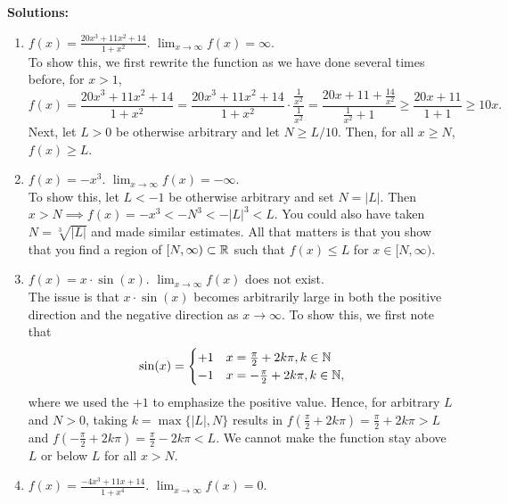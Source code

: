 \textbf{Solutions:}

\begin{enumerate}
\renewcommand{\labelenumi}{(\alph{enumi})}
\setlength{\itemsep}{.3cm}
    
\item $f(x) = \frac{20 x^3 + 11 x^2 + 14}{1 + x^2}$. \Ans $\displaystyle\lim_{x \to \infty} f(x) =  \infty$.\\

To show this, we first rewrite the function as we have done several times before, for $x>1$,
$$f(x) = \frac{20 x^3 + 11 x^2 + 14}{1 + x^2} =  \frac{20 x^3 + 11 x^2 + 14}{1 + x^2} \cdot  \frac{\frac{1}{x^2}}{\frac{1}{x^2}} = \frac{20 x + 11 + \frac{14}{x^2}}{\frac{1}{x^2} + 1}\ge \frac{20 x + 11}{1 + 1}\ge 10 x.$$
Next, let $L>0$ be otherwise arbitrary and let $ N \ge L/10$. Then, for all $x \ge N$, $f(x) \ge L. $

 \item  $f(x) = -x^3$. \Ans $\displaystyle\lim_{x \to \infty} f(x) = - \infty$.\\

 To show this, let $ L < -1$ be otherwise arbitrary and set $N=|L|$. Then $x > N \implies f(x) = -x^3 < - N^3 <-|L|^3 < L$. You could also have taken $N=\sqrt[3]{|L|}$ and made similar estimates. All that matters is that you show that you find a region of $[N, \infty) \subset \mathbb R$ such that $f(x) \le L$ for $x\in [N, \infty)$.

\item $f(x) = x \cdot \sin(x)$. \Ans $\displaystyle\lim_{x \to \infty} f(x)$ does not exist.\\

The issue is that $x\cdot \sin(x)$ becomes arbitrarily large in both the positive direction and the negative direction as $x \to \infty$. To show this, we first note that
$$ \sin(x) = \begin{cases} +1 & x = \frac{\pi}{2} + 2k \pi, k \in \mathbb N \\   -1 & x = -\frac{\pi}{2} + 2k \pi, k \in \mathbb N,\end{cases}$$
where we used the $+1$ to emphasize the positive value. Hence, for arbitrary $L$ and $N>0$, taking $k=\max\{|L|, N\}$ results in $f(\frac{\pi}{2} + 2k \pi) = \frac{\pi}{2} + 2k \pi > L$ and  $f(-\frac{\pi}{2} + 2k \pi) = \frac{\pi}{2} - 2k \pi < L$. We cannot make the function stay above $L$ or below $L$ for all $x > N$.

\item $f(x) = \frac{-4x^3 + 11 x + 14}{1 + x^4}$. \Ans $\displaystyle\lim_{x \to \infty} f(x) =  0$.\\


\end{enumerate}

